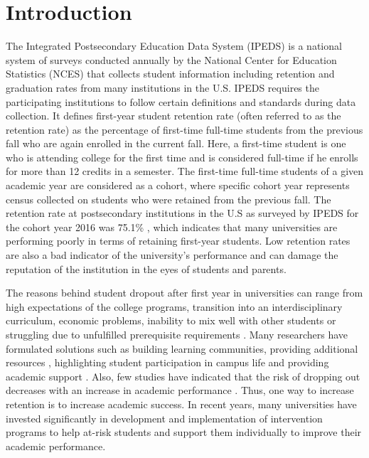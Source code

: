 \documentclass[11pt,openright]{report}
\begin{document}
\chapter{Introduction}\label{chapter:introduction} 
The Integrated Postsecondary Education Data System (IPEDS) is a national system of surveys conducted annually by the National Center for Education Statistics (NCES) that collects student information including retention and graduation rates from many institutions in the U.S. IPEDS requires the participating institutions to follow certain definitions and standards during data collection. It defines first-year student retention rate (often referred to as the retention rate) as the percentage of first-time full-time students from the previous fall who are again enrolled in the current fall. Here, a first-time student is one who is attending college for the first time and is considered full-time if he enrolls for more than 12 credits in a semester. The first-time full-time students of a given academic year are considered as a cohort, where specific cohort year represents census collected on students who were retained from the previous fall. The retention rate at postsecondary institutions in the U.S as surveyed by IPEDS for the cohort year 2016 was 75.1\% \cite{IPEDSRetentionRate}, which indicates that many universities are performing poorly in terms of retaining first-year students. Low retention rates are also a bad indicator of the university's performance and can damage the reputation of the institution in the eyes of students and parents. 

The reasons behind student dropout after first year in universities can range from high expectations of the college programs, transition into an interdisciplinary curriculum, economic problems, inability to mix well with other students or struggling due to unfulfilled prerequisite requirements \cite{lau2003institutional}. Many researchers have formulated solutions such as building learning communities, providing additional resources \cite{tinto1999taking}, highlighting student participation in campus life and providing academic support \cite{lau2003institutional}. Also, few studies have indicated that the risk of dropping out decreases with an increase in academic performance \cite{Murtaugh}. Thus, one way to increase retention is to increase academic success. In recent years, many universities have invested significantly in development and implementation of intervention programs to help at-risk students and support them individually to improve their academic performance. 
\end{document}
